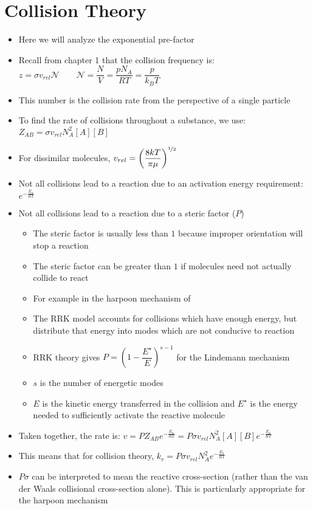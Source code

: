 \documentclass[12pt, openany, letterpaper]{memoir}
\begin{document}
\section{Collision Theory}
\begin{itemize}
	\item Here we will analyze the exponential pre-factor
	\item Recall from chapter 1 that the collision frequency is: $z=\sigma v_{rel}\mathcal{N}\hspace{2em}\mathcal{N} = \dfrac{N}{V} = \dfrac{pN_A}{RT} = \dfrac{p}{k_BT}$
	\item This number is the collision rate from the perspective of a single particle
	\item To find the rate of collisions throughout a substance, we use: $Z_{AB}=\sigma v_{rel}N_A^2[A][B]$
	\item For dissimilar molecules, $v_{rel}=\left(\dfrac{8kT}{\pi\mu}\right)^{\nicefrac{1}{2}}$
	\item Not all collisions lead to a reaction due to an activation energy requirement: $e^{-\frac{E_a}{RT}}$
	\item Not all collisions lead to a reaction due to a steric factor ($P$)
	      \begin{itemize}
		      \item The steric factor is usually less than $1$ because improper orientation will stop a reaction
		      \item The steric factor can be greater than $1$ if molecules need not actually collide to react
		      \item For example in the harpoon mechanism of 
		      \item The RRK model accounts for collisions which have enough energy, but distribute that energy into modes which are not conducive to reaction
		      \item RRK theory gives $P=\left(1-\dfrac{E^{\star}}{E}\right)^{s-1}$ for the Lindemann mechanism
		      \item $s$ is the number of energetic modes
		      \item $E$ is the kinetic energy transferred in the collision and $E^{\star}$ is the energy needed to sufficiently activate the reactive molecule
	      \end{itemize}
	\item Taken together, the rate is: $v=PZ_{AB}e^{-\frac{E_a}{RT}} = P\sigma v_{rel}N_A^2[A][B]e^{-\frac{E_a}{RT}}$
	\item This means that for collision theory, $k_r=P\sigma v_{rel}N_A^2e^{-\frac{E_a}{RT}}$
	\item $P\sigma$ can be interpreted to mean the reactive cross-section (rather than the van der Waals collisional cross-section alone). This is particularly appropriate for the harpoon mechanism
\end{itemize}
\end{document}
